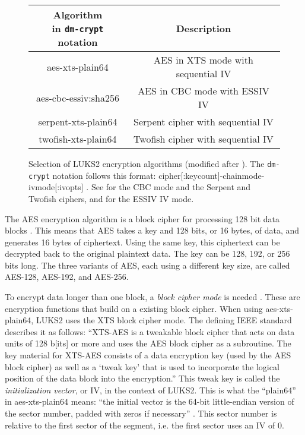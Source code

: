 \begin{figure}[htb!]
	\center
	\begin{tabular}{cc}
		\makecell{\textbf{Algorithm}\\in \texttt{dm-crypt} notation} & \textbf{Description} \\
		\hline
		aes-xts-plain64 & AES in XTS mode with sequential IV \\
		aes-cbc-essiv:sha256 & AES in CBC mode with ESSIV IV \\
		serpent-xts-plain64 & Serpent cipher with sequential IV \\
		twofish-xts-plain64 & Twofish cipher with sequential IV
	\end{tabular}
	\caption[
		Selection of LUKS2 encryption algorithms
	]{
		Selection of LUKS2 encryption algorithms (modified after \cite{Broz2018}). The \texttt{dm-crypt} notation follows this format: cipher[:keycount]-chainmode-ivmode[:ivopts] \cite{Dmcrypt2020}. See \cite{Ferguson2010} for the CBC mode and the Serpent and Twofish ciphers, and \cite{Fruhwirth2005} for the ESSIV IV mode.
	}
	\label{fig:background.luks2.encryptionalgorithms}
\end{figure}

The AES encryption algorithm is a block cipher for processing 128 bit data blocks \cite{Fips197}. This means that AES takes a key and 128 bits, or 16 bytes, of data, and generates 16 bytes of ciphertext. Using the same key, this ciphertext can be decrypted back to the original plaintext data. The key can be 128, 192, or 256 bits long. The three variants of AES, each using a different key size, are called AES-128, AES-192, and AES-256.

To encrypt data longer than one block, a \emph{block cipher mode} is needed \cite{Ferguson2010}. These are encryption functions that build on a existing block cipher. When using aes-xts-plain64, LUKS2 uses the XTS block cipher mode. The defining IEEE standard \cite{Ieee2019} describes it as follows: ``XTS-AES is a tweakable block cipher that acts on data units of 128 b[its] or more and uses the AES block cipher as a subroutine. The key material for XTS-AES consists of a data encryption key (used by the AES block cipher) as well as a `tweak key' that is used to incorporate the logical position of the data block into the encryption.'' This tweak key is called the \emph{initialization vector}, or IV, in the context of LUKS2. This is what the ``plain64'' in aes-xts-plain64 means: ``the initial vector is the 64-bit little-endian version of the sector number, padded with zeros if necessary'' \cite{Dmcrypt2020}. This sector number is relative to the first sector of the segment, i.e. the first sector uses an IV of 0.


